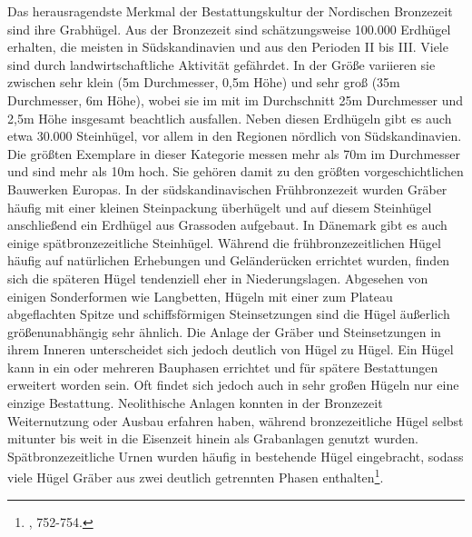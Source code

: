 \documentclass[openany,twoside,twocolumn]{book}
\let\rmarkdownfootnote\footnote%
\def\footnote{\protect\rmarkdownfootnote}
\begin{document}
Das herausragendste Merkmal der Bestattungskultur der Nordischen
Bronzezeit sind ihre Grabhügel. Aus der Bronzezeit sind schätzungsweise
100.000 Erdhügel erhalten, die meisten in Südskandinavien und aus den
Perioden II bis III. Viele sind durch landwirtschaftliche Aktivität
gefährdet. In der Größe variieren sie zwischen sehr klein (5m
Durchmesser, 0,5m Höhe) und sehr groß (35m Durchmesser, 6m Höhe), wobei
sie im mit im Durchschnitt 25m Durchmesser und 2,5m Höhe insgesamt
beachtlich ausfallen. Neben diesen Erdhügeln gibt es auch etwa 30.000
Steinhügel, vor allem in den Regionen nördlich von Südskandinavien. Die
größten Exemplare in dieser Kategorie messen mehr als 70m im Durchmesser
und sind mehr als 10m hoch. Sie gehören damit zu den größten
vorgeschichtlichen Bauwerken Europas. In der südskandinavischen
Frühbronzezeit wurden Gräber häufig mit einer kleinen Steinpackung
überhügelt und auf diesem Steinhügel anschließend ein Erdhügel aus
Grassoden aufgebaut. In Dänemark gibt es auch einige spätbronzezeitliche
Steinhügel. Während die frühbronzezeitlichen Hügel häufig auf
natürlichen Erhebungen und Geländerücken errichtet wurden, finden sich
die späteren Hügel tendenziell eher in Niederungslagen. Abgesehen von
einigen Sonderformen wie Langbetten, Hügeln mit einer zum Plateau
abgeflachten Spitze und schiffsförmigen Steinsetzungen sind die Hügel
äußerlich größenunabhängig sehr ähnlich. Die Anlage der Gräber und
Steinsetzungen in ihrem Inneren unterscheidet sich jedoch deutlich von
Hügel zu Hügel. Ein Hügel kann in ein oder mehreren Bauphasen errichtet
und für spätere Bestattungen erweitert worden sein. Oft findet sich
jedoch auch in sehr großen Hügeln nur eine einzige Bestattung.
Neolithische Anlagen konnten in der Bronzezeit Weiternutzung oder Ausbau
erfahren haben, während bronzezeitliche Hügel selbst mitunter bis weit
in die Eisenzeit hinein als Grabanlagen genutzt wurden.
Spätbronzezeitliche Urnen wurden häufig in bestehende Hügel eingebracht,
sodass viele Hügel Gräber aus zwei deutlich getrennten Phasen
enthalten\footnote{\textcite{thrane_scandinavia_2013}, 752-754.}.
\end{document}
